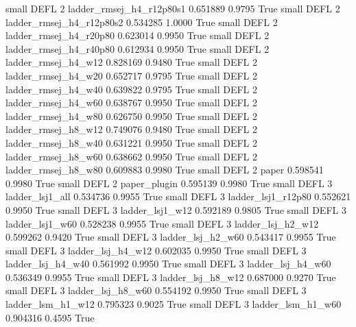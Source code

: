      small     DEFL                 2 ladder_rmsej_h4_r12p80s1   0.651889      0.9795    True
     small     DEFL                 2 ladder_rmsej_h4_r12p80s2   0.534285      1.0000    True
     small     DEFL                 2   ladder_rmsej_h4_r20p80   0.623014      0.9950    True
     small     DEFL                 2   ladder_rmsej_h4_r40p80   0.612934      0.9950    True
     small     DEFL                 2      ladder_rmsej_h4_w12   0.828169      0.9480    True
     small     DEFL                 2      ladder_rmsej_h4_w20   0.652717      0.9795    True
     small     DEFL                 2      ladder_rmsej_h4_w40   0.639822      0.9795    True
     small     DEFL                 2      ladder_rmsej_h4_w60   0.638767      0.9950    True
     small     DEFL                 2      ladder_rmsej_h4_w80   0.626750      0.9950    True
     small     DEFL                 2      ladder_rmsej_h8_w12   0.749076      0.9480    True
     small     DEFL                 2      ladder_rmsej_h8_w40   0.631221      0.9950    True
     small     DEFL                 2      ladder_rmsej_h8_w60   0.638662      0.9950    True
     small     DEFL                 2      ladder_rmsej_h8_w80   0.609883      0.9980    True
     small     DEFL                 2                    paper   0.598541      0.9980    True
     small     DEFL                 2             paper_plugin   0.595139      0.9980    True
     small     DEFL                 3          ladder_lsj1_all   0.534736      0.9955    True
     small     DEFL                 3       ladder_lsj1_r12p80   0.552621      0.9950    True
     small     DEFL                 3          ladder_lsj1_w12   0.592189      0.9805    True
     small     DEFL                 3          ladder_lsj1_w60   0.528238      0.9955    True
     small     DEFL                 3        ladder_lsj_h2_w12   0.599262      0.9420    True
     small     DEFL                 3        ladder_lsj_h2_w60   0.543417      0.9955    True
     small     DEFL                 3        ladder_lsj_h4_w12   0.602035      0.9950    True
     small     DEFL                 3        ladder_lsj_h4_w40   0.561992      0.9950    True
     small     DEFL                 3        ladder_lsj_h4_w60   0.536349      0.9955    True
     small     DEFL                 3        ladder_lsj_h8_w12   0.687000      0.9270    True
     small     DEFL                 3        ladder_lsj_h8_w60   0.554192      0.9950    True
     small     DEFL                 3        ladder_lsm_h1_w12   0.795323      0.9025    True
     small     DEFL                 3        ladder_lsm_h1_w60   0.904316      0.4595    True
